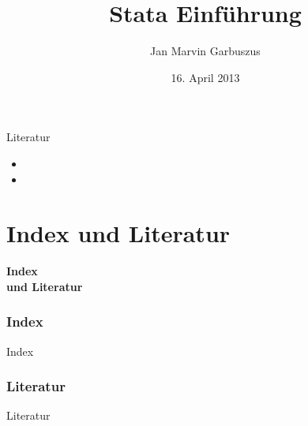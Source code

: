 \documentclass[hyperref={bookmarks=true}, aspectratio=43]{beamer}
\author[Garbuszus]{Jan Marvin Garbuszus}
\title{Stata Einführung}
\date{16. April 2013}
\institute{}
\begin{document}
\begin{frame}
  \maketitle
\end{frame}

\begin{frame}{Literatur}
\begin{minipage}{11cm}

\begin{itemize}
\item {}
\item {}
\end{itemize}

\end{minipage}
\end{frame}








\part{Index und Literatur}
\begin{frame}
\thispagestyle{empty}
\textbf{\huge{Index \\ und Literatur}}
\end{frame}

\section{Index}
\begin{frame}{Index}
\setlength{\columnseprule}{.4pt} 
\begin{multicols}{5}
 \begin{miniscule}
\printindex
 \end{miniscule}
\end{multicols}
\end{frame}

\section{Literatur}
\begin{frame}[allowframebreaks]{Literatur}
 \printbibliography[title=none]
\end{frame}
\end{document}
